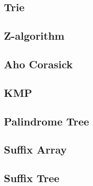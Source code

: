 \subsection{Trie}
\raggedbottom
\subsection{Z-algorithm}
\raggedbottom
\subsection{Aho Corasick}
\raggedbottom
\subsection{KMP}
\raggedbottom
\subsection{Palindrome Tree}
\raggedbottom
\subsection{Suffix Array}
\raggedbottom
\subsection{Suffix Tree}
\raggedbottom

